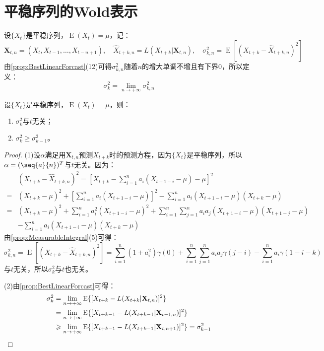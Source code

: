 \section{平稳序列的Wold表示}
\begin{definition}
	设$\{X_t\}$是平稳序列，$\operatorname{E}(X_t)=\mu$，记：
	\begin{equation*}
		\mathbf{X}_{t,n}=(X_t,X_{t-1},\dots,X_{t-n+1}),\quad\hat{X}_{t+k,n}=L(X_{t+k}|\mathbf{X}_{t,n}),\quad\sigma_{k,n}^2=\operatorname{E}[(X_{t+k}-\hat{X}_{t+k,n})^2]
	\end{equation*}
	由\cref{prop:BestLinearForcast}(12)可得$\sigma_{k,n}^2$随着$n$的增大单调不增且有下界$0$，所以定义：
	\begin{equation*}
		\sigma_k^2=\lim_{n\to+\infty}\sigma_{k,n}^2
	\end{equation*}
\end{definition}
\begin{property}
	设$\{X_t\}$是平稳序列，$\operatorname{E}(X_t)=\mu$，则：
	\begin{enumerate}
		\item $\sigma_k^2$与$t$无关；
		\item $\sigma_k^2\geqslant\sigma_{k-1}^2$。
	\end{enumerate}
\end{property}
\begin{proof}
	(1)设$\alpha$满足用$\mathbf{X}_{t,n}$预测$X_{t+k}$时的预测方程，因为$\{X_t\}$是平稳序列，所以$\alpha=(\seq{a}{n})^T$与$t$无关。因为：
	\begin{align*}
		&(X_{t+k}-\hat{X}_{t+k,n})^2=\left[X_{t+k}-\sum_{i=1}^{n}a_i(X_{t+1-i}-\mu)-\mu\right]^2 \\
		=&(X_{t+k}-\mu)^2+\left[\sum_{i=1}^{n}a_i(X_{t+1-i}-\mu)\right]^2-\sum_{i=1}^{n}a_i(X_{t+1-i}-\mu)(X_{t+k}-\mu) \\
		=&(X_{t+k}-\mu)^2+\sum_{i=1}^{n}a_i^2(X_{t+1-i}-\mu)^2+\sum_{i=1}^{n}\sum_{j=1}^{n}a_ia_j(X_{t+1-i}-\mu)(X_{t+1-j}-\mu) \\
		&-\sum_{i=1}^{n}a_i(X_{t+1-i}-\mu)(X_{t+k}-\mu)
	\end{align*}
	由\cref{prop:MeasurableIntegral}(5)可得：
	\begin{equation*}
		\sigma_{k,n}^2=\operatorname{E}[(X_{t+k}-\hat{X}_{t+k,n})^2]=\sum_{i=1}^{n}(1+a_i^2)\gamma(0)+\sum_{i=1}^{n}\sum_{j=1}^{n}a_ia_j\gamma(j-i)-\sum_{i=1}^{n}a_i\gamma(1-i-k)
	\end{equation*}
	与$t$无关，所以$\sigma_k^2$与$t$也无关。\par
	(2)由\cref{prop:BestLinearForcast}可得：
	\begin{align*}
		\sigma_k^2&=\lim_{n\to+\infty}\operatorname{E}\{[X_{t+k}-L(X_{t+k}|\mathbf{X}_{t,n})]^2\} \\
		&=\lim_{n\to+\infty}\operatorname{E}\{[X_{t+k-1}-L(X_{t+k-1}|\mathbf{X}_{t-1,n})]^2\} \\
		&\geqslant\lim_{n\to+\infty}\operatorname{E}\{[X_{t+k-1}-L(X_{t+k-1}|\mathbf{X}_{t,n+1})]^2\}=\sigma_{k-1}^2\qedhere
	\end{align*}
\end{proof}
